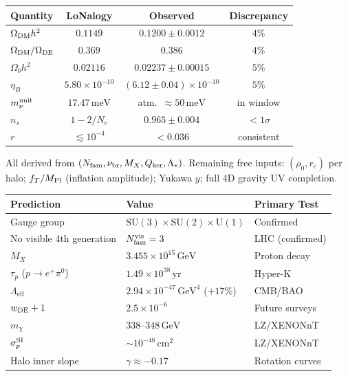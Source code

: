 \documentclass[12pt]{article}
\theoremstyle{plain}
\theoremstyle{definition}
\numberwithin{equation}{section}
\newcommand{\br}{\mathrm{br}}
\newcommand{\kker}{\mathrm{ker}}
\newcommand{\eff}{\mathrm{eff}}
\begin{document}
\begin{center}
\begin{tabular}{lccc}
\toprule
Quantity & LoNalogy & Observed & Discrepancy\\
\midrule
$\Omega_{\rm DM}h^2$ & $0.1149$ & $0.1200\pm0.0012$ & $4\%$\\
$\Omega_{\rm DM}/\Omega_{\rm DE}$ & $0.369$ & $0.386$ & $4\%$\\
$\Omega_b h^2$ & $0.02116$ & $0.02237\pm0.00015$ & $5\%$\\
$\eta_B$ & $5.80\times10^{-10}$ & $(6.12\pm0.04)\times10^{-10}$ & $5\%$\\
$m_\nu^{\rm unit}$ & $17.47\,\mathrm{meV}$ & atm.\ $\approx50\,\mathrm{meV}$ & in window\\
$n_s$ & $1-2/N_e$ & $0.965\pm0.004$ & $<1\sigma$\\
$r$ & $\lesssim10^{-4}$ & $<0.036$ & consistent\\
\bottomrule
\end{tabular}
\end{center}

All derived from $(N_{\rm fam},\nu_\br,M_X,Q_{\kker},\Lambda_*)$. Remaining free inputs: $(\rho_0,r_c)$ per halo; $f_T/M_{\rm Pl}$ (inflation amplitude); Yukawa $y$; full 4D gravity UV completion.

\begin{center}
\begin{tabular}{p{4.5cm}p{4cm}p{4cm}}
\toprule
Prediction & Value & Primary Test\\
\midrule
Gauge group & $\mathrm{SU}(3)\times\mathrm{SU}(2)\times\mathrm{U}(1)$ & Confirmed\\
No visible 4th generation & $N_{\rm fam}^{\rm vis}=3$ & LHC (confirmed)\\
$M_X$ & $3.455\times10^{15}\,\mathrm{GeV}$ & Proton decay\\
$\tau_p$ ($p\to e^+\pi^0$) & $1.49\times10^{38}\,\mathrm{yr}$ & Hyper-K\\
$\Lambda_\eff$ & $2.94\times10^{-47}\,\mathrm{GeV}^4$ ($+17\%$) & CMB/BAO\\
$w_{\rm DE}+1$ & $2.5\times10^{-6}$ & Future surveys\\
$m_\chi$ & $338$--$348\,\mathrm{GeV}$ & LZ/XENONnT\\
$\sigma_p^{\rm SI}$ & $\sim10^{-48}\,\mathrm{cm}^2$ & LZ/XENONnT\\
Halo inner slope & $\gamma\approx-0.17$ & Rotation curves\\
\bottomrule
\end{tabular}
\end{center}
\end{document}
